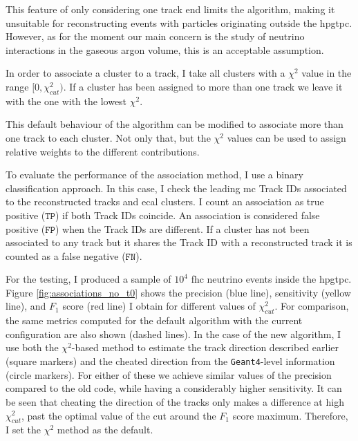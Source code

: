 This feature of only considering one track end limits the algorithm, making it unsuitable for reconstructing events with particles originating outside the \gls{hpgtpc}. However, as for the moment our main concern is the study of neutrino interactions in the gaseous argon volume, this is an acceptable assumption.

In order to associate a cluster to a track, I take all clusters with a $\chi^{2}$ value in the range $[0, \chi^{2}_{cut})$. If a cluster has been assigned to more than one track we leave it with the one with the lowest $\chi^{2}$.

This default behaviour of the algorithm can be modified to associate more than one track to each cluster. Not only that, but the $\chi^{2}$ values can be used to assign relative weights to the different contributions.

To evaluate the performance of the association method, I use a binary classification approach. In this case, I check the leading \gls{mc} Track IDs associated to the reconstructed tracks and \gls{ecal} clusters. I count an association as true positive ($\mathtt{TP}$) if both Track IDs coincide. An association is considered false positive ($\mathtt{FP}$) when the Track IDs are different. If a cluster has not been associated to any track but it shares the Track ID with a reconstructed track it is counted as a false negative ($\mathtt{FN}$).

For the testing, I produced a sample of $10^{4}$ \gls{fhc} neutrino events inside the \gls{hpgtpc}. Figure \ref{fig:associations_no_t0} shows the precision (blue line), sensitivity (yellow line), and $F_{1}$ score (red line) I obtain for different values of $\chi^{2}_{cut}$. For comparison, the same metrics computed for the default algorithm with the current configuration are also shown (dashed lines). In the case of the new algorithm, I use both the $\chi^{2}$-based method to estimate the track direction described earlier (square markers) and the cheated direction from the \texttt{Geant4}-level information (circle markers). For either of these we achieve similar values of the precision compared to the old code, while having a considerably higher sensitivity. It can be seen that cheating the direction of the tracks only makes a difference at high $\chi^{2}_{cut}$, past the optimal value of the cut around the $F_{1}$ score maximum. Therefore, I set the $\chi^{2}$ method as the default.

